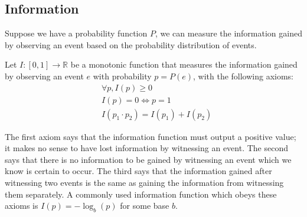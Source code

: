 %

\subsection{Information}
Suppose we have a probability function $P$, we can measure the information gained by observing an event based on the probability distribution of events.
%  
\begin{mydef}
Let $I: [0,1] \rightarrow \mathbb{R}$ be a monotonic function that measures the information gained by observing an event $e$ with probability $p = P(e)$, with the following axioms:
%
  \begin{align*}
  &\forall p, I(p) \geq 0\\
  & I(p) = 0 \Leftrightarrow p = 1\\
  & I(p_1 \cdot p_2) = I(p_1) + I(p_2)
  \end{align*} 
%
\end{mydef} 
%
The first axiom says that the information function must output a positive value;  it makes no sense to have lost information by witnessing an event.  The second says that there is no information to be gained by witnessing an event which we know is certain to occur.  The third says that the information gained after witnessing two events is the same as gaining the information from witnessing them separately.  A commonly used information function which obeys these axioms is $I(p) = -\log_b(p)$ for some base $b$.
